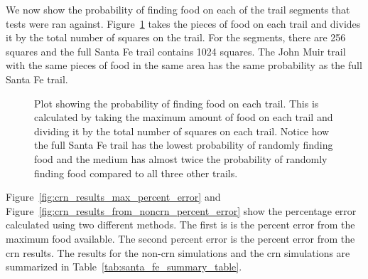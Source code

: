 \clearpage
We now show the probability of finding food on each of the trail segments that tests were ran against. Figure~\ref{fig:prob_finding_food_plot} takes the pieces of food on each trail and divides it by the total number of squares on the trail. For the segments, there are 256 squares and the full Santa Fe trail contains 1024 squares. The John Muir trail with the same pieces of food in the same area has the same probability as the full Santa Fe trail.

\begin{figure}[hbt]
\centering
{}
\caption[Probability of Food on Trail]{Plot showing the probability of finding food on each trail. This is calculated by taking the maximum amount of food on each trail and dividing it by the total number of squares on each trail. Notice how the full Santa Fe trail has the lowest probability of randomly finding food and the medium has almost twice the probability of randomly finding food compared to all three other trails.}
\label{fig:prob_finding_food_plot}
\end{figure}

\clearpage
Figure~\ref{fig:crn_results_max_percent_error} and Figure~\ref{fig:crn_results_from_noncrn_percent_error} show the percentage error calculated using two different methods. The first is is the percent error from the maximum food available. The second percent error is the percent error from the \gls{crn} results. The results for the non-\gls{crn} simulations and the \gls{crn} simulations are summarized in Table~\ref{tab:santa_fe_summary_table}.

